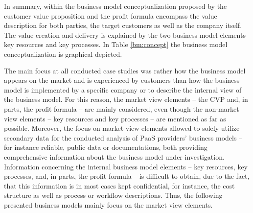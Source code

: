 In summary, within the business model conceptualization proposed by \citet[p. 54]{Johnson2008} the customer value proposition and the profit formula encompass the value description for both parties, the target customers as well as the company itself. The value creation and delivery is explained by the two business model elements key resources and key processes. In Table \ref{bm:concept} the business model conceptualization is graphical depicted.



The main focus at all conducted case studies was rather how the business model appears on the market and is experienced by customers than how the business model is implemented by a specific company or to describe the internal view of the business model. For this reason, the market view elements -- the \ac{CVP} and, in parts, the profit formula -- are mainly considered, even though the non-market view elements -- key resources and key processes -- are mentioned as far as possible. Moreover, the focus on market view elements allowed to solely utilize secondary data for the conducted analysis of \ac{PaaS} providers' business models -- for instance reliable, public data or documentations, both providing comprehensive information about the business model under investigation. Information concerning the internal business model elements -- key resources, key processes, and, in parts, the profit formula -- is difficult to obtain, due to the fact, that this information is in most cases kept confidential, for instance, the cost structure as well as process or workflow descriptions. Thus, the following presented business models mainly focus on the market view elements.